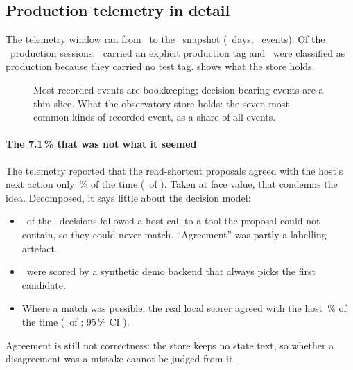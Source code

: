 \subsection{Production telemetry in detail}\label{sec:telemetrydetail}

The telemetry window ran from \ObWeekStart\ to the \ObCutoff\ snapshot (\ObDays\ days, \ObEvents\ events). Of the
\ObProdSessions\ production sessions, \ObProdTagged\ carried an explicit production tag and \ObProdDefault\ were
classified as production because they carried no test tag.  shows what the store holds.

\begin{figure}[tbp]
\centering
{}\par\smallskip

\caption{Most recorded events are bookkeeping; decision-bearing events are a thin slice. What the observatory store holds: the seven most common kinds of recorded event, as a share of all events.}
\label{fig:obsmix}
\end{figure}

\paragraph{The 7.1\,\% that was not what it seemed} The telemetry reported that the read-shortcut proposals agreed
with the host's next action only \ObAllRate\,\% of the time (\ObAllMatch\ of \ObAllN). Taken at face value, that
condemns the idea. Decomposed, it says little about the decision model:
\begin{itemize}
  \item \ObUnmatchN\ of the \ObAllN\ decisions followed a host call to a tool the proposal could not contain, so they
    could never match. ``Agreement'' was partly a labelling artefact.
  \item \ObDemoN\ were scored by a synthetic demo backend that always picks the first candidate.
  \item Where a match was possible, the real local scorer agreed with the host \ObCandRate\,\% of the time
    (\ObCandMatch\ of \ObCandN; 95\,\% CI \ObCandCI).
\end{itemize}
Agreement is still not correctness: the store keeps no state text, so whether a disagreement was a mistake cannot be
judged from it.

